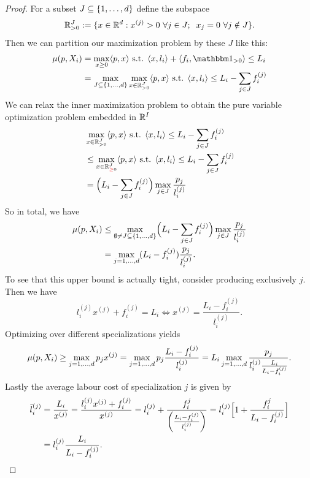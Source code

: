 \begin{proof}
	For a subset \(J\subseteq\{1,\dots,d\}\) define the subspace
	\[
		\mathbb{R}_{>0}^J:= \{
			x\in \mathbb{R}^d:
			x^{(j)} > 0\ \forall j\in J;\;\; x_j =0\ \forall j\notin J
		\}.
	\]
	Then we can partition our maximization problem by these \(J\) like this:
	\begin{align*}
		\mu(p, X_i)
		&= \max_{x\ge 0}\langle p, x\rangle \text{ s.t. }
		\langle x, l_i\rangle  + \langle f_i, \ind_{>0}\rangle \le L_i\\
		&= \max_{J \subseteq \{1,\dots,\dims\}}
		\max_{x\in \real_{>0}^J}
		\langle p, x\rangle \text{ s.t. }
		\langle x, l_i\rangle \le L_i - \sum_{j\in J}f_i^{(j)}
	\end{align*}	
	We can relax the inner maximization problem to obtain the pure variable
	optimization problem embedded in \(\mathbb{R}^I\)
	\begin{align*}
		&\max_{x\in \mathbb{R}_{>0}^J}
		\langle p, x\rangle \text{ s.t. }
		\langle x, l_i\rangle \le L_i - \sum_{j\in J}f_i^{(j)}\\
		&\le 
		\max_{x\in \mathbb{R}_{{\color{red} \ge} 0}^J}
		\langle p, x\rangle \text{ s.t. }
		\langle x, l_i\rangle \le L_i - \sum_{j\in J}f_i^{(j)}\\
		&= \Bigl(L_i - \sum_{j\in J}f_i^{(j)}\Bigr)
		\max_{j\in J} \frac{p_j}{l_i^{(j)}}
	\end{align*}
	So in total, we have
	\begin{align*}
		\mu(p, X_i)
		&\le \max_{\emptyset \neq J\subseteq \{1,\dots,d\}}
		\Bigl(L_i - \sum_{j\in J}f_i^{(j)}\Bigr)
		\max_{j\in J} \frac{p_j}{l_i^{(j)}}\\
		&= \max_{j=1,\dots,d}
		(L_i - f_i^{(j)}) \frac{p_j}{l_i^{(j)}}.
	\end{align*}
	To see that this upper bound is actually tight, consider producing
	exclusively \(j\). Then we have
	\[
		l_i^{(j)} x^{(j)} + f_i^{(j)} = L_i \iff x^{(j)}
		= \frac{L_i-f_i^{(j)}}{l_i^{(j)}}.
	\]
	Optimizing over different specializations yields
	\[
		\mu(p, X_i) \ge \max_{j=1,\dots,d} p_j x^{(j)}
		= \max_{j=1,\dots,d}
		p_j \frac{L_i - f_i^{(j)}}{l_i^{(j)}}
		= L_i\max_{j=1,\dots,d}
		\frac{p_j}{l_i^{(j)}\frac{L_i}{L_i - f_i^{(j)}}}.
	\]
	Lastly the average labour cost of specialization \(j\) is given by
	\begin{align*}
		\bar{l}_i^{(j)}
		&= \frac{L_i}{x^{(j)}}
		= \frac{l_i^{(j)} x^{(j)} + f_i^{(j)}}{x^{(j)}}
		= l_i^{(j)} + \frac{f_i^{j}}{\left(\frac{L_i-f_i^{(j)}}{l_i^{(j)}}\right)}
		= l_i^{(j)} \Bigl[1 + \frac{f_i^{j}}{L_i-f_i^{(j)}}\Bigr]\\
		&=l_i^{(j)}\frac{L_i}{L_i - f_i^{(j)}}.
		\qedhere
	\end{align*}
\end{proof}

